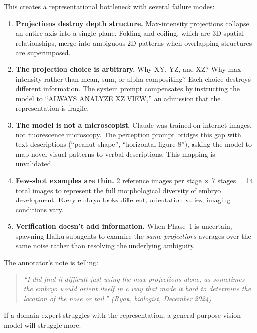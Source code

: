 \documentclass[11pt, a4paper]{article}
\begin{document}
This creates a representational bottleneck with several failure modes:

\begin{enumerate}[leftmargin=*, itemsep=2pt]
  \item \textbf{Projections destroy depth structure.} Max-intensity projections
    collapse an entire axis into a single plane. Folding and coiling, which are
    3D spatial relationships, merge into ambiguous 2D patterns when overlapping
    structures are superimposed.

  \item \textbf{The projection choice is arbitrary.} Why XY, YZ, and XZ? Why
    max-intensity rather than mean, sum, or alpha compositing? Each choice
    destroys different information. The system prompt compensates by instructing
    the model to ``ALWAYS ANALYZE XZ VIEW,'' an admission that the
    representation is fragile.

  \item \textbf{The model is not a microscopist.} Claude was trained on internet
    images, not fluorescence microscopy. The perception prompt bridges this gap
    with text descriptions (``peanut shape'', ``horizontal figure-8''), asking
    the model to map novel visual patterns to verbal descriptions. This mapping
    is unvalidated.

  \item \textbf{Few-shot examples are thin.} 2 reference images per stage
    $\times$ 7 stages = 14 total images to represent the full morphological
    diversity of embryo development. Every embryo looks different; orientation
    varies; imaging conditions vary.

  \item \textbf{Verification doesn't add information.} When Phase~1 is uncertain,
    spawning Haiku subagents to examine the \emph{same projections} averages over
    the same noise rather than resolving the underlying ambiguity.
\end{enumerate}

The annotator's note is telling:
\begin{quote}
\itshape
``I did find it difficult just using the max projections alone, as sometimes the
embryo would orient itself in a way that made it hard to determine the location of
the nose or tail.'' (Ryan, biologist, December 2024)
\end{quote}

If a domain expert struggles with the representation, a general-purpose vision model will
struggle more.
\end{document}
